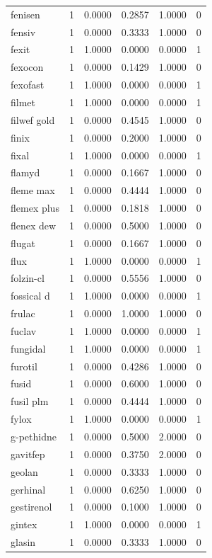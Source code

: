 \begin{longtable}{p{3.0cm}rrrrr}
fenisen & 1 & 0.0000 & 0.2857 & 1.0000 & 0 \\
fensiv & 1 & 0.0000 & 0.3333 & 1.0000 & 0 \\
fexit & 1 & 1.0000 & 0.0000 & 0.0000 & 1 \\
fexocon & 1 & 0.0000 & 0.1429 & 1.0000 & 0 \\
fexofast & 1 & 1.0000 & 0.0000 & 0.0000 & 1 \\
filmet & 1 & 1.0000 & 0.0000 & 0.0000 & 1 \\
filwef gold & 1 & 0.0000 & 0.4545 & 1.0000 & 0 \\
finix & 1 & 0.0000 & 0.2000 & 1.0000 & 0 \\
fixal & 1 & 1.0000 & 0.0000 & 0.0000 & 1 \\
flamyd & 1 & 0.0000 & 0.1667 & 1.0000 & 0 \\
fleme max & 1 & 0.0000 & 0.4444 & 1.0000 & 0 \\
flemex plus & 1 & 0.0000 & 0.1818 & 1.0000 & 0 \\
flenex dew & 1 & 0.0000 & 0.5000 & 1.0000 & 0 \\
flugat & 1 & 0.0000 & 0.1667 & 1.0000 & 0 \\
flux & 1 & 1.0000 & 0.0000 & 0.0000 & 1 \\
folzin-cl & 1 & 0.0000 & 0.5556 & 1.0000 & 0 \\
fossical d & 1 & 1.0000 & 0.0000 & 0.0000 & 1 \\
frulac & 1 & 0.0000 & 1.0000 & 1.0000 & 0 \\
fuclav & 1 & 1.0000 & 0.0000 & 0.0000 & 1 \\
fungidal & 1 & 1.0000 & 0.0000 & 0.0000 & 1 \\
furotil & 1 & 0.0000 & 0.4286 & 1.0000 & 0 \\
fusid & 1 & 0.0000 & 0.6000 & 1.0000 & 0 \\
fusil plm & 1 & 0.0000 & 0.4444 & 1.0000 & 0 \\
fylox & 1 & 1.0000 & 0.0000 & 0.0000 & 1 \\
g-pethidne & 1 & 0.0000 & 0.5000 & 2.0000 & 0 \\
gavitfep & 1 & 0.0000 & 0.3750 & 2.0000 & 0 \\
geolan & 1 & 0.0000 & 0.3333 & 1.0000 & 0 \\
gerhinal & 1 & 0.0000 & 0.6250 & 1.0000 & 0 \\
gestirenol & 1 & 0.0000 & 0.1000 & 1.0000 & 0 \\
gintex & 1 & 1.0000 & 0.0000 & 0.0000 & 1 \\
glasin & 1 & 0.0000 & 0.3333 & 1.0000 & 0 \\

\end{longtable}

